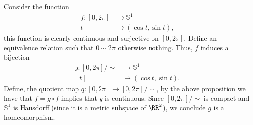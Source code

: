 \documentclass[12pt, a4paper]{article}
\begin{document}
\begin{mdexample}
    Consider the function 
    \[\begin{aligned}
        f:[0,2\pi] &\to \mathbb{S}^1 \\
        t &\mapsto (\cos t,\sin t),
    \end{aligned}\]
    this function is clearly continuous and surjective on \([0,2\pi]\). Define an equivalence relation such that \(0\sim 2\pi\) otherwise nothing. Thus, \(f\) induces a bijection 
    \[\begin{aligned}
        g : [0,2\pi] /\sim &\to \mathbb{S}^1 \\
        [t] &\mapsto (\cos t, \sin t).
    \end{aligned}\]
    Define, the quotient map \(q:[0,2\pi] \to [0,2\pi]/\sim\), by the above proposition we have that \(f = g \circ f\) implies that \(g\) is continuous. Since \([0,2\pi]/\sim\) is compact and \(\mathbb{S}^1\) is Hausdorff (since it is a metric subspace of \(\RR^2\)), we conclude \(g\) is a homeomorphism.
\end{mdexample}
\end{document}
